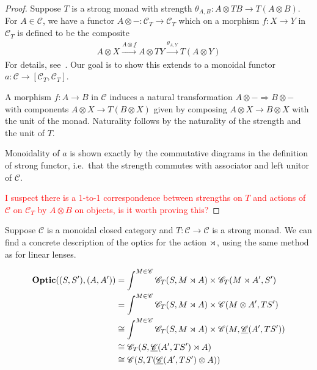 \documentclass[11pt,letterpaper]{article}
\theoremstyle{plain}
\theoremstyle{definition}
\newcommand{\C}{\mathscr{C}}
\newcommand{\homC}{\underline{\C}}
\newcommand{\Optic}{\mathbf{Optic}}
\newcommand{\todo}[1]{\textcolor{red}{\small #1}}
\begin{document}
\begin{proof}
Suppose $T$ is a strong monad with strength $\theta_{A, B} : A \otimes T B \to T(A \otimes B)$. For $A \in \C$, we have a functor $A \otimes - : \C_T \to \C_T$ which on a morphism $f : X \to Y$ in $\C_T$ is defined to be the composite
\begin{align*}
A \otimes X \xrightarrow{A \otimes \underline{f}} A \otimes TY \xrightarrow{\theta_{A, Y}} T(A \otimes Y)
\end{align*}
For details, see~\cite[Theorem 4.2]{PremonoidalCategories}. Our goal is to show this extends to a monoidal functor $a : \C \to [\C_T, \C_T]$.

A morphism $f : A \to B$ in $\C$ induces a natural transformation $A \otimes - \Rightarrow B \otimes -$ with components $A \otimes X \to T(B \otimes X)$ given by composing $A \otimes X \to B \otimes X$ with the unit of the monad. Naturality follows by the naturality of the strength and the unit of $T$.

Monoidality of $a$ is shown exactly by the commutative diagrams in the definition of strong functor, i.e.\ that the strength commutes with associator and left unitor of $\C$.

\todo{I suspect there is a 1-to-1 correspondence between strengths on $T$ and actions of $\C$ on $\C_T$ by $A \otimes B$ on objects, is it worth proving this?}
\end{proof}

Suppose $\C$ is a monoidal closed category and $T : \C \to \C$ is a strong monad. We can find a concrete description of the optics for the action $\rtimes$, using the same method as for linear lenses.

\begin{align*}
\Optic((S, S'), (A, A'))
&= \int^{M \in \C} \C_T(S, M \monact A) \times \C_T(M \monact A', S') \\
&= \int^{M \in \C} \C_T(S, M \monact A) \times \C(M \otimes A', T S') \\
&\cong \int^{M \in \C} \C_T(S, M \monact A) \times \C(M, \homC(A', T S')) \\
&\cong \C_T(S, \homC(A', T S') \monact A) \\
&\cong \C(S, T(\homC(A', T S') \otimes A))
\end{align*}
\end{document}
